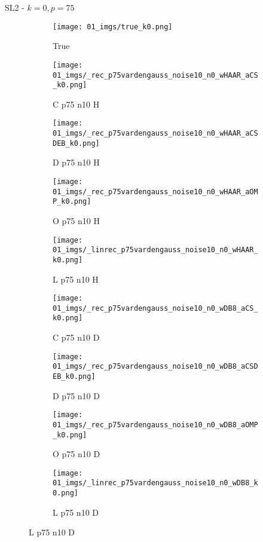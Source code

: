 \begin{frame}{SL2 - $k=0,p=75$}{}
\begin{figure}
\begin{subfigure}{0.1\textwidth}
\texttt{[image: 01\_imgs/true\_k0.png]}
\caption*{\Tiny True}
\end{subfigure}
\begin{subfigure}{0.1\textwidth}
\texttt{[image: 01\_imgs/\_rec\_p75vardengauss\_noise10\_n0\_wHAAR\_aCS\_k0.png]}
\caption*{\Tiny C p75 n10 H}
\end{subfigure}
\begin{subfigure}{0.1\textwidth}
\texttt{[image: 01\_imgs/\_rec\_p75vardengauss\_noise10\_n0\_wHAAR\_aCSDEB\_k0.png]}
\caption*{\Tiny D p75 n10 H}
\end{subfigure}
\begin{subfigure}{0.1\textwidth}
\texttt{[image: 01\_imgs/\_rec\_p75vardengauss\_noise10\_n0\_wHAAR\_aOMP\_k0.png]}
\caption*{\Tiny O p75 n10 H}
\end{subfigure}
\begin{subfigure}{0.1\textwidth}
\texttt{[image: 01\_imgs/\_linrec\_p75vardengauss\_noise10\_n0\_wHAAR\_k0.png]}
\caption*{\Tiny L p75 n10 H}
\end{subfigure}
\begin{subfigure}{0.1\textwidth}
\texttt{[image: 01\_imgs/\_rec\_p75vardengauss\_noise10\_n0\_wDB8\_aCS\_k0.png]}
\caption*{\Tiny C p75 n10 D}
\end{subfigure}
\begin{subfigure}{0.1\textwidth}
\texttt{[image: 01\_imgs/\_rec\_p75vardengauss\_noise10\_n0\_wDB8\_aCSDEB\_k0.png]}
\caption*{\Tiny D p75 n10 D}
\end{subfigure}
\begin{subfigure}{0.1\textwidth}
\texttt{[image: 01\_imgs/\_rec\_p75vardengauss\_noise10\_n0\_wDB8\_aOMP\_k0.png]}
\caption*{\Tiny O p75 n10 D}
\end{subfigure}
\begin{subfigure}{0.1\textwidth}
\texttt{[image: 01\_imgs/\_linrec\_p75vardengauss\_noise10\_n0\_wDB8\_k0.png]}
\caption*{\Tiny L p75 n10 D}
\end{subfigure}

\vspace{5pt}


\end{figure}
\end{frame}

